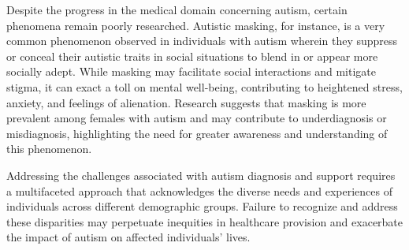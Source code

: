 Despite the progress in the medical domain concerning autism, certain phenomena remain poorly researched. Autistic masking, for instance, is a very common phenomenon observed in individuals with autism wherein they suppress or conceal their autistic traits in social situations to blend in or appear more socially adept. While masking may facilitate social interactions and mitigate stigma, it can exact a toll on mental well-being, contributing to heightened stress, anxiety, and feelings of alienation. Research suggests that masking is more prevalent among females with autism and may contribute to underdiagnosis or misdiagnosis, highlighting the need for greater awareness and understanding of this phenomenon\cite{2017PuttingMyBest}.

Addressing the challenges associated with autism diagnosis and support requires a multifaceted approach that acknowledges the diverse needs and experiences of individuals across different demographic groups. Failure to recognize and address these disparities may perpetuate inequities in healthcare provision and exacerbate the impact of autism on affected individuals' lives.
